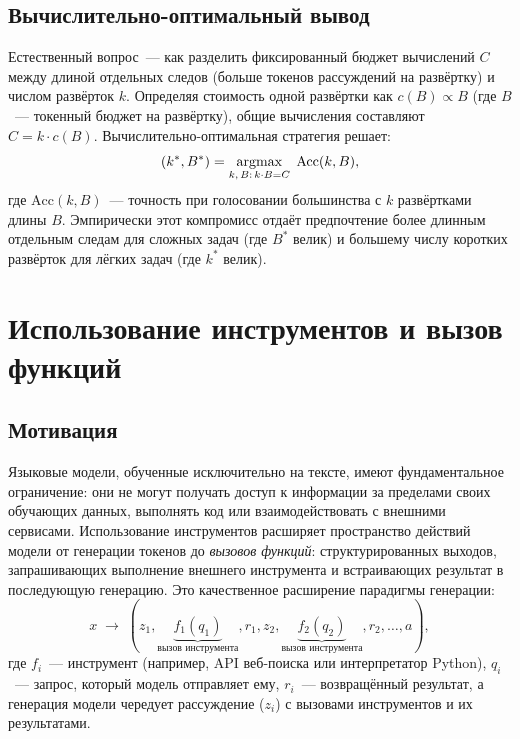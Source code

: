 \subsection{Вычислительно-оптимальный вывод}
\label{subsec:compute-optimal}

Естественный вопрос~--- как разделить фиксированный бюджет вычислений $C$ между
длиной отдельных следов (больше токенов рассуждений на развёртку)
и числом развёрток $k$. Определяя стоимость одной развёртки как
$c(B) \propto B$ (где $B$~--- токенный бюджет на развёртку), общие
вычисления составляют $C = k \cdot c(B)$. Вычислительно-оптимальная стратегия
решает:
\[
(k^*, B^*) = \operatorname*{argmax}_{k,\,B:\,k\cdot B = C}\; \text{Acc}(k, B),
\]
где $\text{Acc}(k, B)$~--- точность при голосовании большинства с $k$
развёртками длины $B$. Эмпирически этот компромисс отдаёт предпочтение более длинным
отдельным следам для сложных задач (где $B^*$ велик) и большему числу
коротких развёрток для лёгких задач (где $k^*$ велик).

\section{Использование инструментов и вызов функций}
\label{sec:tool-use}

\subsection{Мотивация}

Языковые модели, обученные исключительно на тексте, имеют фундаментальное ограничение:
они не могут получать доступ к информации за пределами своих обучающих данных, выполнять
код или взаимодействовать с внешними сервисами. Использование инструментов
расширяет пространство действий модели от генерации токенов до
\emph{вызовов функций}: структурированных выходов, запрашивающих выполнение
внешнего инструмента и встраивающих результат в последующую генерацию.
Это качественное расширение парадигмы генерации:
\begin{equation}
\label{eq:tool-loop}
x \;\longrightarrow\; (z_1, \underbrace{f_1(q_1)}_{\mbox{вызов инструмента}},
r_1, z_2, \underbrace{f_2(q_2)}_{\mbox{вызов инструмента}}, r_2, \ldots, a),
\end{equation}
где $f_i$~--- инструмент (например, API веб-поиска или интерпретатор Python),
$q_i$~--- запрос, который модель отправляет ему, $r_i$~--- возвращённый результат,
а генерация модели чередует рассуждение ($z_i$)
с вызовами инструментов и их результатами.

